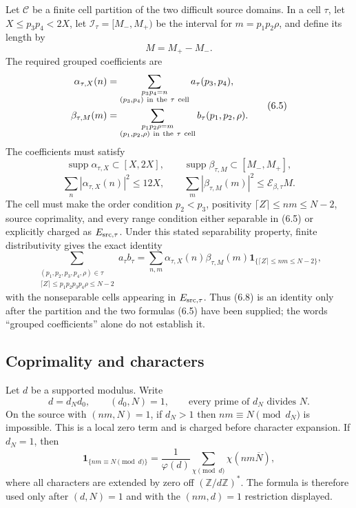 \documentclass[11pt]{article}
\theoremstyle{definition}
\begin{document}
Let \(\mathcal C\) be a finite cell partition of the two difficult source
domains.  In a cell \(\tau\), let \(X\le p_3p_4<2X\), let
\(\mathcal I_\tau=[M_-,M_+)\) be the interval for
\(m=p_1p_2\rho\), and define its length by
\[
 M=M_+-M_-.
\tag{6.4}
\]
The required grouped coefficients are
\[
\begin{aligned}
 \alpha_{\tau,X}(n)
 &=\sum_{\substack{p_3p_4=n\\(p_3,p_4)\ {\rm in\ the\ }\tau{\rm\ cell}}}
 a_\tau(p_3,p_4),\\
 \beta_{\tau,M}(m)
 &=\sum_{\substack{p_1p_2\rho=m\\(p_1,p_2,\rho)\ {\rm in\ the\ }\tau{\rm\ cell}}}
 b_\tau(p_1,p_2,\rho).
\end{aligned}
\tag{6.5}
\]
The coefficients must satisfy
\[
 \operatorname{supp}\alpha_{\tau,X}\subset[X,2X],\qquad
 \operatorname{supp}\beta_{\tau,M}\subset[M_-,M_+],
\tag{6.6}
\]
\[
 \sum_n|\alpha_{\tau,X}(n)|^2\le12X,\qquad
 \sum_m|\beta_{\tau,M}(m)|^2\le \mathcal E_{\beta,\tau}M.
\tag{6.7}
\]
The cell must make the order condition \(p_2<p_3\), positivity
\(\lceil Z\rceil\le nm\le N-2\), source coprimality, and every range
condition either separable in (6.5) or explicitly charged as
\(E_{\rm src,\tau}\).  Under this stated separability property, finite
distributivity gives the exact identity
\[
\sum_{\substack{(p_1,p_2,p_3,p_4,\rho)\in\tau\\
\lceil Z\rceil\le p_1p_2p_3p_4\rho\le N-2}}
 a_\tau b_\tau
 =
 \sum_{n,m}\alpha_{\tau,X}(n)\beta_{\tau,M}(m)
 \mathbf1_{\{\lceil Z\rceil\le nm\le N-2\}},
\tag{6.8}
\]
with the nonseparable cells appearing in \(E_{\rm src,\tau}\).
Thus (6.8) is an identity only after the partition and the two formulas
(6.5) have been supplied; the words “grouped coefficients” alone do not
establish it.

\subsection{Coprimality and characters}
\label{sec:characters}

Let \(d\) be a supported modulus.  Write
\[
 d=d_Nd_0,\qquad (d_0,N)=1,\qquad
 \text{every prime of }d_N\text{ divides }N.
\tag{6.9}
\]
On the source with \((nm,N)=1\), if \(d_N>1\) then
\(nm\equiv N\pmod {d_N}\) is impossible.  This is a local zero term and
is charged before character expansion.  If \(d_N=1\), then
\[
 \mathbf1_{\{nm\equiv N\pmod d\}}
 =
 \frac1{\varphi(d)}
 \sum_{\chi\pmod d}\chi(nm\overline N),
\tag{6.10}
\]
where all characters are extended by zero off \((\mathbb Z/d\mathbb Z)^*\).
The formula is therefore used only after \((d,N)=1\) and with the
\((nm,d)=1\) restriction displayed.
\end{document}
